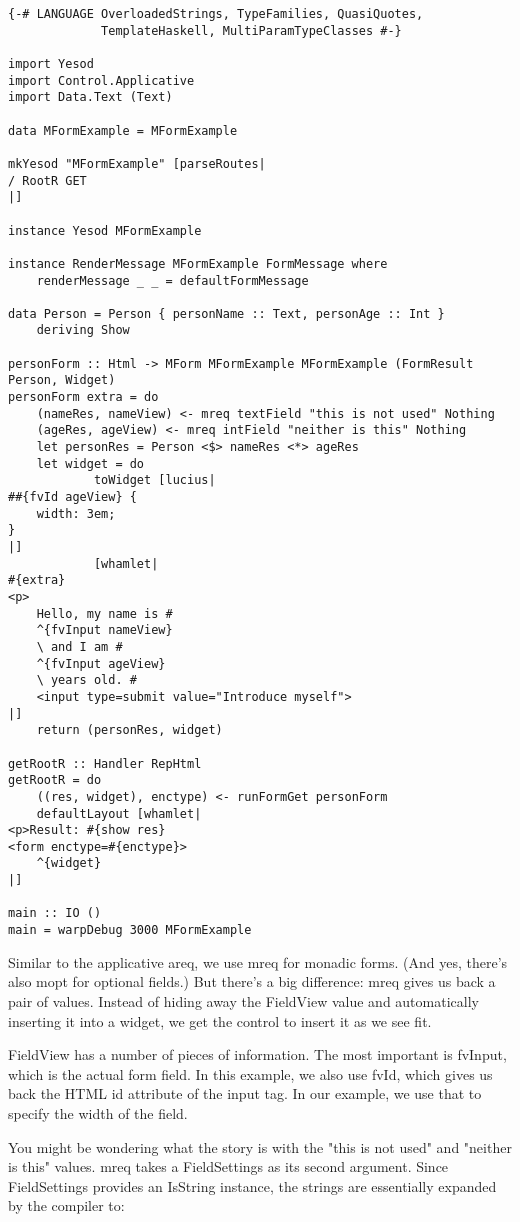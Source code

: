 \begin{lstlisting}
{-# LANGUAGE OverloadedStrings, TypeFamilies, QuasiQuotes,
             TemplateHaskell, MultiParamTypeClasses #-}

import Yesod
import Control.Applicative
import Data.Text (Text)

data MFormExample = MFormExample

mkYesod "MFormExample" [parseRoutes|
/ RootR GET
|]

instance Yesod MFormExample

instance RenderMessage MFormExample FormMessage where
    renderMessage _ _ = defaultFormMessage

data Person = Person { personName :: Text, personAge :: Int }
    deriving Show

personForm :: Html -> MForm MFormExample MFormExample (FormResult Person, Widget)
personForm extra = do
    (nameRes, nameView) <- mreq textField "this is not used" Nothing
    (ageRes, ageView) <- mreq intField "neither is this" Nothing
    let personRes = Person <$> nameRes <*> ageRes
    let widget = do
            toWidget [lucius|
##{fvId ageView} {
    width: 3em;
}
|]
            [whamlet|
#{extra}
<p>
    Hello, my name is #
    ^{fvInput nameView}
    \ and I am #
    ^{fvInput ageView}
    \ years old. #
    <input type=submit value="Introduce myself">
|]
    return (personRes, widget)

getRootR :: Handler RepHtml
getRootR = do
    ((res, widget), enctype) <- runFormGet personForm
    defaultLayout [whamlet|
<p>Result: #{show res}
<form enctype=#{enctype}>
    ^{widget}
|]

main :: IO ()
main = warpDebug 3000 MFormExample
\end{lstlisting}

Similar to the applicative areq, we use mreq for monadic forms. (And yes, there's also
mopt for optional fields.) But there's a big difference: mreq gives us back a pair of
values. Instead of hiding away the FieldView value and automatically inserting it into a
widget, we get the control to insert it as we see fit.

FieldView has a number of pieces of information. The most important is fvInput, which is
the actual form field. In this example, we also use fvId, which gives us back the HTML id
attribute of the input tag. In our example, we use that to specify the width of the field.

You might be wondering what the story is with the "this is not used" and "neither is this"
values. mreq takes a FieldSettings as its second argument. Since FieldSettings provides an
IsString instance, the strings are essentially expanded by the compiler to:

